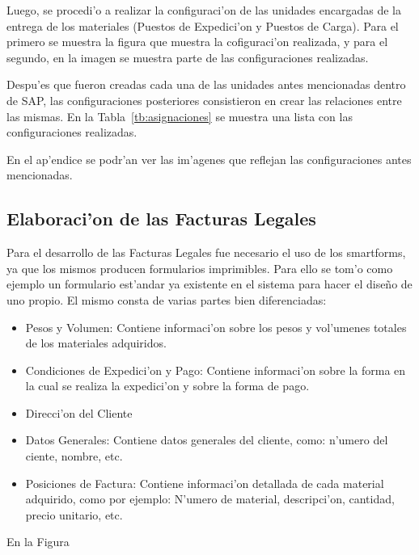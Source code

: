 	Luego, se procedi'o a realizar la configuraci'on de las unidades encargadas de la entrega de los materiales (Puestos de Expedici'on y Puestos de Carga). Para el primero se muestra la figura que muestra la cofiguraci'on realizada, y para el segundo, en la imagen se muestra parte de las configuraciones realizadas.

Despu'es que fueron creadas cada una de las unidades antes mencionadas dentro de SAP, las configuraciones posteriores consistieron en crear las relaciones entre las mismas. En la Tabla~\ref{tb:asignaciones} se muestra una lista con las configuraciones realizadas.

En el ap'endice se podr'an ver las im'agenes que reflejan las configuraciones antes mencionadas.
\subsection{Elaboraci'on de las Facturas Legales}
	Para el desarrollo de las Facturas Legales fue necesario el uso de los smartforms, ya que los mismos producen formularios imprimibles. Para ello se tom'o como ejemplo un formulario est'andar ya existente en el sistema para hacer el dise\~no de uno propio. El mismo consta de varias partes bien diferenciadas:
\begin{itemize}
\item Pesos y Volumen: Contiene informaci'on sobre los pesos y vol'umenes totales de los materiales adquiridos.
\item Condiciones de Expedici'on y Pago: Contiene informaci'on sobre la forma en la cual se realiza la expedici'on y sobre la forma de pago.
\item Direcci'on del Cliente
\item Datos Generales: Contiene datos generales del cliente, como: n'umero del ciente, nombre, etc.
\item Posiciones de Factura: Contiene informaci'on detallada de cada material adquirido, como por ejemplo: N'umero de material, descripci'on, cantidad, precio unitario, etc.
\end{itemize}
	En la Figura  


